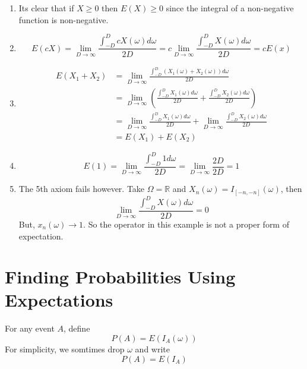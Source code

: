 \begin{enumerate}
    \item Its clear that if $X \geq 0$ then $E(X) \geq 0$ since the integral of a non-negative function is non-negative.
    \item 
    \[E(cX) = \lim_{D \rightarrow \infty} \frac{\int_{-D}^D cX(\omega) d\omega}{2D} = c\lim_{D \rightarrow \infty}\frac{\int_{-D}^DX(\omega)d\omega}{2D} =  cE(x)\]
    \item 
    \begin{align*}
        E(X_1 + X_2) &= \lim_{D \rightarrow \infty} \frac{\int_{-D}^D (X_1(\omega) + X_2(\omega)) d\omega}{2D}\\
        &=\lim_{D \rightarrow \infty} \left(\frac{\int_{-D}^D X_1(\omega) d\omega}{2D} + \frac{\int_{-D}^D X_2(\omega) d\omega}{2D}\right)\\
        &=\lim_{D \rightarrow \infty} \frac{\int_{-D}^D X_1(\omega) d\omega}{2D} + \lim_{D \rightarrow \infty}\frac{\int_{-D}^D X_2(\omega) d\omega}{2D}\\
        &= E(X_1) + E(X_2)
    \end{align*}
    \item 
    \[E(1) = \lim_{D \rightarrow \infty} \frac{\int_{-D}^D 1 d \omega}{2D} = \lim_{D\rightarrow \infty} \frac{2D}{2D} = 1\]
    \item 
    The 5th axiom fails however. Take $\Omega = \mathbb{R}$ and $X_n (\omega) = I_{[-n,-n]}(\omega)$, then 
    \[\lim_{D \rightarrow \infty} \frac{\int_{-D}^D X(\omega)d\omega}{2D} = 0\]
    But, $x_n(\omega) \rightarrow 1$. So the operator in this example is not a proper form of expectation. 
\end{enumerate}
\section{Finding Probabilities Using Expectations}
\begin{definition}
    For any event $A$, define 
    \[P(A) = E(I_A(\omega))\]
    For simplicity, we somtimes drop $\omega$ and write 
    \[P(A) = E(I_A)\]
\end{definition}
